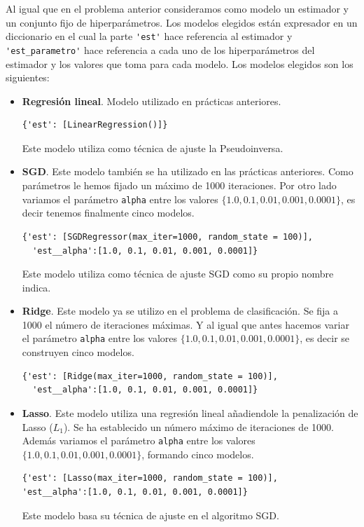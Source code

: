 \documentclass[size=a4, parskip=half, titlepage=false, toc=flat, toc=bib, 12pt]{scrartcl}
\begin{document}
Al igual que en el problema anterior consideramos como modelo un estimador y un conjunto fijo de hiperparámetros. Los modelos elegidos están expresador en un diccionario en el cual la parte \verb|'est'| hace referencia al estimador y \verb|'est_parametro'| hace referencia a cada uno de los hiperparámetros del estimador y los valores que toma para cada modelo. Los modelos elegidos son los siguientes:
\begin{itemize}
\item \textbf{Regresión lineal}. Modelo utilizado en prácticas anteriores.
\begin{verbatim}
{'est': [LinearRegression()]}
\end{verbatim}
Este modelo utiliza como técnica de ajuste la Pseudoinversa.
\item \textbf{SGD}. Este modelo también se ha utilizado en las prácticas anteriores. Como parámetros le hemos fijado un máximo de 1000 iteraciones. Por otro lado variamos el parámetro \verb|alpha| entre los valores $\{1.0, 0.1, 0.01, 0.001, 0.0001 \}$, es decir tenemos finalmente cinco modelos.
\begin{verbatim}
{'est': [SGDRegressor(max_iter=1000, random_state = 100)],
  'est__alpha':[1.0, 0.1, 0.01, 0.001, 0.0001]}
\end{verbatim}
Este modelo utiliza como técnica de ajuste SGD como su propio nombre indica.
\item \textbf{Ridge}. Este modelo ya se utilizo en el problema de clasificación. Se fija a 1000 el número de iteraciones máximas. Y al igual que antes hacemos variar el parámetro \verb|alpha| entre los valores $\{1.0, 0.1, 0.01, 0.001, 0.0001\}$, es decir se construyen cinco modelos.
\begin{verbatim}
{'est': [Ridge(max_iter=1000, random_state = 100)],
  'est__alpha':[1.0, 0.1, 0.01, 0.001, 0.0001]}
\end{verbatim}
\item \textbf{Lasso}. Este modelo utiliza una regresión lineal añadiendole la penalización de Lasso ($L_1$). Se ha establecido un número máximo de iteraciones de 1000. Además variamos el parámetro \verb|alpha| entre los valores $\{1.0, 0.1, 0.01, 0.001, 0.0001\}$, formando cinco modelos.
\begin{verbatim}
{'est': [Lasso(max_iter=1000, random_state = 100)],
'est__alpha':[1.0, 0.1, 0.01, 0.001, 0.0001]}
\end{verbatim}
Este modelo basa su técnica de ajuste en el algoritmo SGD.
\end{itemize}
\end{document}
